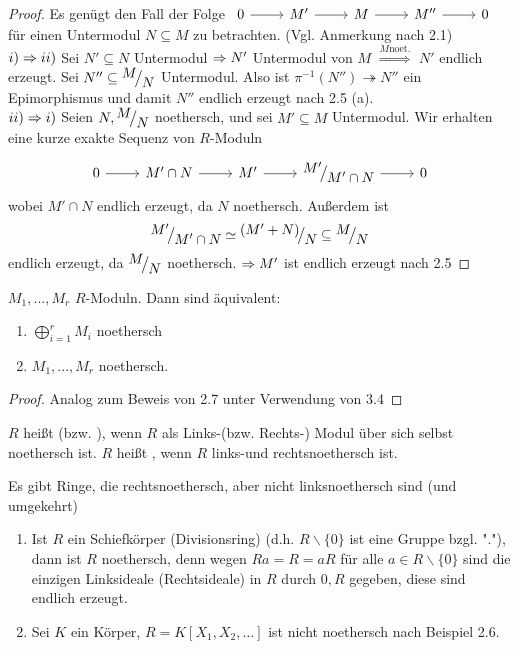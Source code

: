 \begin{proof}
	Es genügt den Fall der Folge $\begin{tikzcd}
	0  \arrow{r} & M' \arrow{r} & M \arrow{r} & M'' \arrow{r} & 0
	\end{tikzcd} $  für einen Untermodul $N \subseteq M $ zu betrachten. (Vgl. Anmerkung nach 2.1)\\
	$i) \Rightarrow ii)$ Sei $N' \subseteq N $ Untermodul $\Rightarrow N' $ Untermodul von $M$ $\overset{M \text{noet.}}{\Longrightarrow} $ $N' $ endlich erzeugt. Sei $N'' \subseteq \QR{M}{N}$ Untermodul. Also ist $\pi^{-1}(N'') \twoheadrightarrow N''$ ein Epimorphismus und damit $ N'' $ endlich erzeugt nach 2.5 (a). \\
	$ii) \Rightarrow i)$ Seien $N, \QR{M}{N}$ noethersch, und sei $M' \subseteq M $ Untermodul. Wir erhalten eine kurze exakte Sequenz von $R$-Moduln  $$\begin{tikzcd}
	0  \arrow{r} & M' \cap N \arrow{r}{} & M' \arrow{r}{} & \QR{M'}{M' \cap N} \arrow{r} & 0
	\end{tikzcd} $$wobei $M' \cap N $ endlich erzeugt, da $N$ noethersch. Außerdem ist $$\QR{M'}{M' \cap N} \simeq \QR{(M'+N)}{N} \subseteq \QR{M}{N} $$ endlich erzeugt, da $\QR{M}{N} $ noethersch. $\Rightarrow M' $ ist endlich erzeugt nach 2.5
\end{proof}
\begin{bem}\label{bem3.5}
	$M_1,...,M_r$ $R$-Moduln. Dann sind äquivalent: 
	\begin{enumerate} [label= \roman*)]
		\item $\bigoplus_{i=1}^r M_i $ noethersch 
		\item $M_1,...,M_r $ noethersch.
	\end{enumerate}
\end{bem}
\begin{proof}
	Analog zum Beweis von 2.7 unter Verwendung von 3.4
\end{proof}
\begin{df}\label{3.6}
	$R$ heißt  (bzw. ), wenn $R$ als Links-(bzw. Rechts-) Modul über sich selbst noethersch ist. $R$ heißt , wenn $R$ links-und rechtsnoethersch ist.
\end{df}
\begin{anm}
	Es gibt Ringe, die rechtsnoethersch, aber nicht linksnoethersch sind (und umgekehrt)
\end{anm}
\begin{bsp}
	\begin{enumerate} [label=\alph*)]
		\item Ist $R$ ein Schiefkörper (Divisionsring) (d.h. $R \backslash \{0\}$ ist eine Gruppe bzgl. "."), dann ist $R$ noethersch, denn wegen $Ra=R=aR$ für alle $ a \in R \backslash \{0\}$ sind die einzigen Linksideale (Rechtsideale) in $R$ durch $0,R$ gegeben, diese sind endlich erzeugt.
		\item Sei $K$ ein Körper, $ R= K [ X_1,X_2,\dots ]$ ist nicht noethersch nach Beispiel 2.6.
	\end{enumerate}
\end{bsp}
